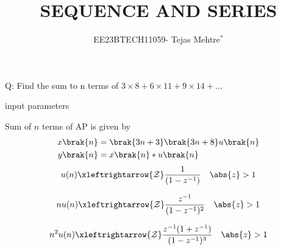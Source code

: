 \documentclass[journal,12pt,onecolumn]{IEEEtran}
\theoremstyle{remark}
\begin{document}
\let\vec\mathbf



\title{SEQUENCE AND SERIES}
\author{EE23BTECH11059- Tejas Mehtre$^{*}$%
}
\maketitle




\bigskip

\renewcommand{\thefigure}{\theenumi}
\renewcommand{\thetable}{\theenumi}
Q: Find the sum to n terms of $3 \times 8 + 6 \times 11 + 9 \times 14 + ...$ \\
    \solution
    \fi
    \begin{table}[!ht]
    \centering
        
    \caption{input parameters}
\end{table}
        Sum of $n$ terms of AP is given by
        \begin{align}
            x\brak{n} &= \brak{3n+3}\brak{3n+8}u\brak{n} \\
            y\brak{n} &= x\brak{n}*u\brak{n}
        \end{align}
        \begin{equation}
   u(n) \xleftrightarrow{\mathcal{Z}} \frac{1}{(1-z^{-1})}  \quad \abs{z}>1\\ \label{eq:11.9.4.6.1.eq}
\end{equation}

\begin{equation}   
   nu(n) \xleftrightarrow{\mathcal{Z}} \frac{z^{-1}}{(1-z^{-1})^2} \quad \abs{z}>1\\ \label{eq:11.9.4.6.2.eq}
\end{equation}

\begin{equation}   
   n^2u(n) \xleftrightarrow{\mathcal{Z}} \frac{z^{-1}(1+z^{-1})}{(1-z^{-1})^3} \quad \abs{z}>1 \\ \label{eq:11.9.4.6.3.eq}
\end{equation}  
\end{document}
